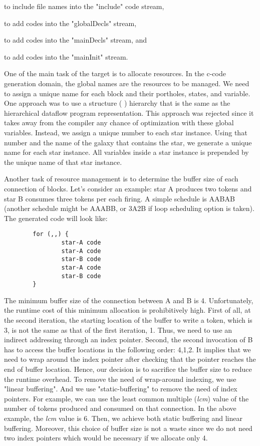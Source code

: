 to include file names into the "include" code stream,

to add codes into the "globalDecls" stream,

to add codes into the "mainDecls" stream, and

to add codes into the "mainInit" stream.

One of the main task of the target is to allocate resources. In the c-code
generation domain, the global names are the resources to be managed.
We need to assign a unique name for each block and their portholes, states,
and variable. One approach was to use a structure (
) hierarchy that is the same as the hierarchical dataflow program
representation. This approach was rejected since it takes away from the 
compiler any chance of optimization with these global variables. 
Instead, we assign a unique number to each star instance. Using that number
and the name of the galaxy that contains the star, we generate a unique name
for each star instance. All variables inside a star instance is
prepended by the unique name of that star instance.

Another task of resource management is to determine the buffer size of
each connection of blocks.  Let's consider an example: star A produces
two tokens and star B consumes three tokens per each firing. A simple
schedule is AABAB (another schedule might be AAABB, or 3A2B if loop
scheduling option is taken). The generated code will look like:

\begin{verbatim}
        for (,,) {
                star-A code
                star-A code
                star-B code
                star-A code
                star-B code
        }
\end{verbatim}

The minimum buffer size of the connection
between A and B is 4. Unfortunately, the runtime cost of this 
minimum allocation is prohibitively high. First of all, at the second
iteration,
the starting location of the buffer to write a token, which is 3,
is not the same as that of the first iteration, 1. Thus, we need to
use an indirect addressing through an index pointer. Second, the second
invocation of B has to access the buffer locations in the following order:
4,1,2. It implies that we need to wrap around the index pointer after
checking that the pointer reaches the end of buffer location.
Hence, our decision is to sacrifice the buffer size to reduce the runtime
overhead. To remove the need of wrap-around indexing, we use "linear
buffering". And we use "static-buffering" to remove the need of
index pointers. For example, we can use the least common multiple (\emph{lcm})
value of the number of tokens produced and consumed on that connection.
In the above example, the \emph{lcm} value is 6. Then, we achieve both
static buffering and linear buffering. Moreover, this choice of
buffer size is not a waste since we do not need two index pointers which
would be necessary if we allocate only 4.

